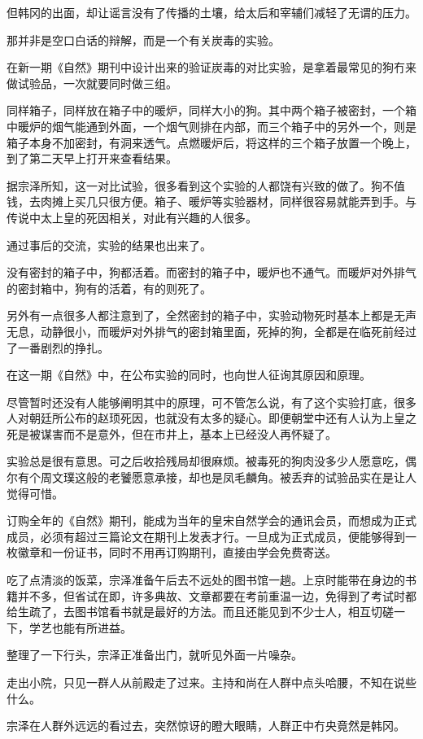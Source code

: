 但韩冈的出面，却让谣言没有了传播的土壤，给太后和宰辅们减轻了无谓的压力。

那并非是空口白话的辩解，而是一个有关炭毒的实验。

在新一期《自然》期刊中设计出来的验证炭毒的对比实验，是拿着最常见的狗冇来做试验品，一次就要同时做三组。

同样箱子，同样放在箱子中的暖炉，同样大小的狗。其中两个箱子被密封，一个箱中暖炉的烟气能通到外面，一个烟气则排在内部，而三个箱子中的另外一个，则是箱子本身不加密封，有洞来透气。点燃暖炉后，将这样的三个箱子放置一个晚上，到了第二天早上打开来查看结果。

据宗泽所知，这一对比试验，很多看到这个实验的人都饶有兴致的做了。狗不值钱，去肉摊上买几只很方便。箱子、暖炉等实验器材，同样很容易就能弄到手。与传说中太上皇的死因相关，对此有兴趣的人很多。

通过事后的交流，实验的结果也出来了。

没有密封的箱子中，狗都活着。而密封的箱子中，暖炉也不通气。而暖炉对外排气的密封箱中，狗有的活着，有的则死了。

另外有一点很多人都注意到了，全然密封的箱子中，实验动物死时基本上都是无声无息，动静很小，而暖炉对外排气的密封箱里面，死掉的狗，全都是在临死前经过了一番剧烈的挣扎。

在这一期《自然》中，在公布实验的同时，也向世人征询其原因和原理。

尽管暂时还没有人能够阐明其中的原理，可不管怎么说，有了这个实验打底，很多人对朝廷所公布的赵顼死因，也就没有太多的疑心。即便朝堂中还有人认为上皇之死是被谋害而不是意外，但在市井上，基本上已经没人再怀疑了。

实验总是很有意思。可之后收拾残局却很麻烦。被毒死的狗肉没多少人愿意吃，偶尔有个周文璞这般的老饕愿意承接，却也是凤毛麟角。被丢弃的试验品实在是让人觉得可惜。

订购全年的《自然》期刊，能成为当年的皇宋自然学会的通讯会员，而想成为正式成员，必须有超过三篇论文在期刊上发表才行。一旦成为正式成员，便能够得到一枚徽章和一份证书，同时不用再订购期刊，直接由学会免费寄送。

吃了点清淡的饭菜，宗泽准备午后去不远处的图书馆一趟。上京时能带在身边的书籍并不多，但省试在即，许多典故、文章都要在考前重温一边，免得到了考试时都给生疏了，去图书馆看书就是最好的方法。而且还能见到不少士人，相互切磋一下，学艺也能有所进益。

整理了一下行头，宗泽正准备出门，就听见外面一片噪杂。

走出小院，只见一群人从前殿走了过来。主持和尚在人群中点头哈腰，不知在说些什么。

宗泽在人群外远远的看过去，突然惊讶的瞪大眼睛，人群正中冇央竟然是韩冈。


